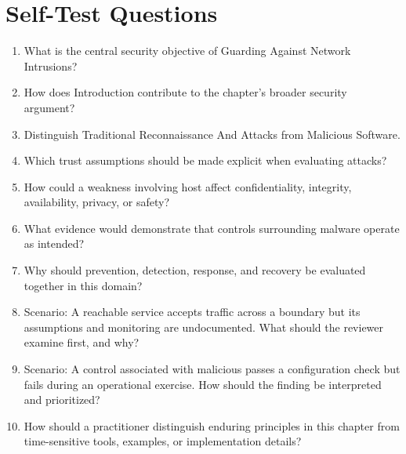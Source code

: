 \documentclass[11pt]{article}
\begin{document}
\section*{Self-Test Questions}
\begin{enumerate}
\item What is the central security objective of Guarding Against Network Intrusions?
\item How does Introduction contribute to the chapter's broader security argument?
\item Distinguish Traditional Reconnaissance And Attacks from Malicious Software.
\item Which trust assumptions should be made explicit when evaluating attacks?
\item How could a weakness involving host affect confidentiality, integrity, availability, privacy, or safety?
\item What evidence would demonstrate that controls surrounding malware operate as intended?
\item Why should prevention, detection, response, and recovery be evaluated together in this domain?
\item Scenario: A reachable service accepts traffic across a boundary but its assumptions and monitoring are undocumented. What should the reviewer examine first, and why?
\item Scenario: A control associated with malicious passes a configuration check but fails during an operational exercise. How should the finding be interpreted and prioritized?
\item How should a practitioner distinguish enduring principles in this chapter from time-sensitive tools, examples, or implementation details?
\end{enumerate}
\end{document}
